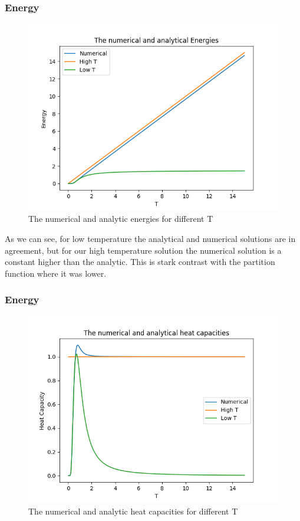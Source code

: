 \documentclass[a4paper,norsk, 10pt]{article}
\begin{document}
\subsubsection{Energy}
\begin{figure}[H]
\centering
\includegraphics[scale=0.5]{n_E.png}
\caption{The numerical and analytic energies for different T}
\end{figure}	

As we can see, for low temperature the analytical and numerical solutions are in agreement, but for our high temperature solution the numerical solution is a constant higher than the analytic. This is stark contrast with the partition function where it was lower.


\subsubsection{Energy}
\begin{figure}[H]
\centering
\includegraphics[scale=0.5]{n_cv.png}
\caption{The numerical and analytic heat capacities for different T}
\end{figure}
\end{document}
